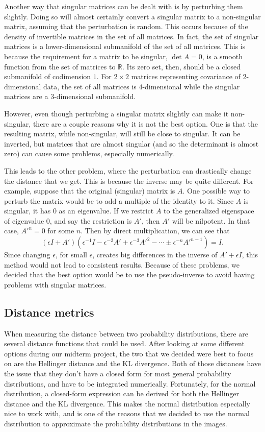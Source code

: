 \documentclass{article}
\begin{document}
Another way that singular matrices can be dealt with is by perturbing them slightly. Doing so will almost certainly convert a singular matrix to a non-singular matrix, assuming that the perturbation is random. This occurs because of the density of invertible matrices in the set of all matrices. In fact, the set of singular matrices is a lower-dimensional submanifold of the set of all matrices. This is because the requirement for a matrix to be singular, $\det A=0$, is a smooth function from the set of matrices to $\mathbb R$. Its zero set, then, should be a closed submanifold of codimension $1$. For $2\times 2$ matrices representing covariance of $2$-dimensional data, the set of all matrices is $4$-dimensional while the singular matrices are a $3$-dimensional submanifold.

However, even though perturbing a singular matrix slightly can make it non-singular, there are a couple reasons why it is not the best option. One is that the resulting matrix, while non-singular, will still be close to singular. It can be inverted, but matrices that are almost singular (and so the determinant is almost zero) can cause some problems, especially numerically.

This leads to the other problem, where the perturbation can drastically change the distance that we get. This is because the inverse may be quite different. For example, suppose that the original (singular) matrix is $A$. One possible way to perturb the matrix would be to add a multiple of the identity to it. Since $A$ is singular, it has $0$ as an eigenvalue. If we restrict $A$ to the generalized eigenspace of eigenvalue $0$, and say the restriction is $A'$, then $A'$ will be nilpotent. In that case, $A'^n=0$ for some $n$. Then by direct multiplication, we can see that
\[
    (\epsilon I+A')(\epsilon^{-1}I-\epsilon^{-2}A'+\epsilon^{-3}A'^2-\cdots
    \pm\epsilon^{-n}A'^{n-1})=I.
\]
Since changing $\epsilon$, for small $\epsilon$, creates big differences in the inverse of $A'+\epsilon I$, this method would not lead to consistent results. Because of these problems, we decided that the best option would be to use the pseudo-inverse to avoid having problems with singular matrices.

\subsection{Distance metrics}

When measuring the distance between two probability distributions, there are several distance functions that could be used. After looking at some different options during our midterm project, the two that we decided were best to focus on are the Hellinger distance and the KL divergence. Both of those distances have the issue that they don't have a closed form for most general probability distributions, and have to be integrated numerically. Fortunately, for the normal distribution, a closed-form expression can be derived for both the Hellinger distance and the KL divergence. This makes the normal distribution especially nice to work with, and is one of the reasons that we decided to use the normal distribution to approximate the probability distributions in the images.
\end{document}

